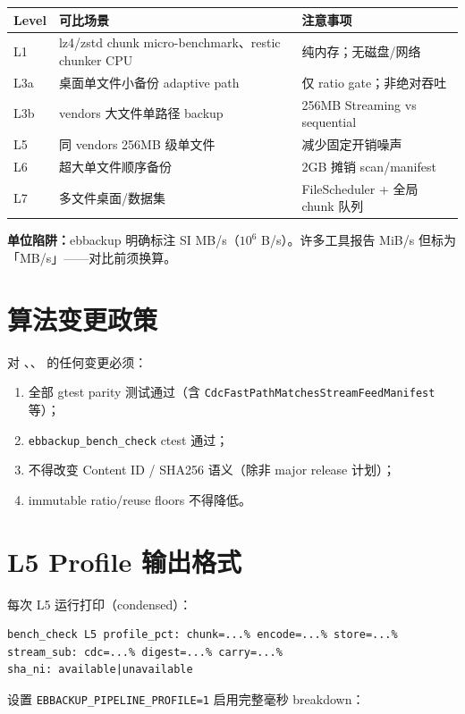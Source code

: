 \begin{longtable}{@{}llp{7cm}@{}}
\toprule
Level & 可比场景 & 注意事项 \\
\midrule
L1 & lz4/zstd chunk micro-benchmark、restic chunker CPU & 纯内存；无磁盘/网络 \\
L3a & 桌面单文件小备份 adaptive path & 仅 ratio gate；非绝对吞吐 \\
L3b &  vendors 大文件单路径 backup & 256MB Streaming vs sequential \\
L5 & 同 vendors 256MB 级单文件 & 减少固定开销噪声 \\
L6 & 超大单文件顺序备份 & 2GB 摊销 scan/manifest \\
L7 & 多文件桌面/数据集 & FileScheduler + 全局 chunk 队列 \\
\bottomrule
\end{longtable}

\textbf{单位陷阱：}ebbackup 明确标注 SI MB/s（$10^6$ B/s）。许多工具报告 MiB/s 但标为「MB/s」——对比前须换算。

\section{算法变更政策}

对 、、 的任何变更必须：

\begin{enumerate}[nosep]
  \item 全部 gtest parity 测试通过（含 \texttt{CdcFastPathMatchesStreamFeedManifest} 等）；
  \item \texttt{ebbackup\_bench\_check} ctest 通过；
  \item 不得改变 Content ID / SHA256 语义（除非 major release 计划）；
  \item immutable ratio/reuse floors 不得降低。
\end{enumerate}

\section{L5 Profile 输出格式}

每次 L5 运行打印（condensed）：

\begin{verbatim}
bench_check L5 profile_pct: chunk=...% encode=...% store=...%
stream_sub: cdc=...% digest=...% carry=...%
sha_ni: available|unavailable
\end{verbatim}

设置 \texttt{EBBACKUP\_PIPELINE\_PROFILE=1} 启用完整毫秒 breakdown：

